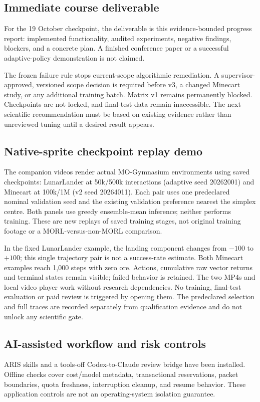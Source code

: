 \subsection{Immediate course deliverable}
For the 19 October checkpoint, the deliverable is this evidence-bounded
progress report: implemented functionality, audited experiments, negative
findings, blockers, and a concrete plan. A finished conference paper or a
successful adaptive-policy demonstration is not claimed.

The frozen failure rule stops current-scope algorithmic remediation. A
supervisor-approved, versioned scope decision is required before v3, a changed
Minecart study, or any additional training batch. Matrix v1 remains permanently
blocked. Checkpoints are not locked, and final-test data remain inaccessible.
The next scientific recommendation must be based on existing evidence rather
than unreviewed tuning until a desired result appears.

\subsection{Native-sprite checkpoint replay demo}
The companion videos render actual MO-Gymnasium environments using saved
checkpoints: LunarLander at 50k/500k interactions (adaptive seed 20262001) and
Minecart at 100k/1M (v2 seed 20264011). Each pair uses one predeclared nominal
validation seed and the existing validation preference nearest the simplex
centre. Both panels use greedy ensemble-mean inference; neither performs
training. These are new replays of saved training stages, not original training
footage or a MORL-versus-non-MORL comparison.

In the fixed LunarLander example, the landing component changes from $-100$
to $+100$; this single trajectory pair is not a success-rate estimate. Both
Minecart examples reach 1,000 steps with zero ore. Actions, cumulative raw
vector returns and terminal states remain visible; failed behavior is retained.
The two MP4s and local video player work without research dependencies. No
training, final-test evaluation or paid review is triggered by opening them.
The predeclared selection and full traces are recorded separately from
qualification evidence and do not unlock any scientific gate.

\subsection{AI-assisted workflow and risk controls}
ARIS skills and a tools-off Codex-to-Claude review bridge have been installed.
Offline checks cover cost/model metadata, transactional reservations, packet
boundaries, quota freshness, interruption cleanup, and resume behavior. These
application controls are not an operating-system isolation guarantee.

